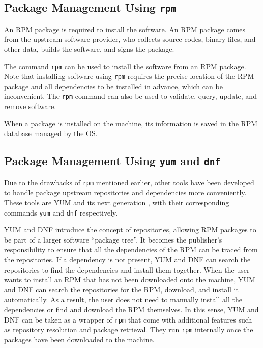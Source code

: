 \subsection{Package Management Using \texttt{rpm}}

An RPM package is required to install the software. An RPM package comes from the upstream software provider, who collects source codes, binary files, and other data, builds the software, and signs the package.

The command \verb|rpm| can be used to install the software from an RPM package. Note that installing software using \verb|rpm| requires the precise location of the RPM package and all dependencies to be installed in advance, which can be inconvenient. The \verb|rpm| command can also be used to validate, query, update, and remove software.

When a package is installed on the machine, its information is saved in the RPM database managed by the OS.

\subsection{Package Management Using \texttt{yum} and \texttt{dnf}}

Due to the drawbacks of \verb|rpm| mentioned earlier, other tools have been developed to handle package upstream repositories and dependencies more conveniently. These tools are YUM and its next generation , with their corresponding commands \verb|yum| and \verb|dnf| respectively.

YUM and DNF introduce the concept of repositories, allowing RPM packages to be part of a larger software ``package tree''. It becomes the publisher's responsibility to ensure that all the dependencies of the RPM can be traced from the repositories. If a dependency is not present, YUM and DNF can search the repositories to find the dependencies and install them together. When the user wants to install an RPM that has not been downloaded onto the machine, YUM and DNF can search the repositories for the RPM, download, and install it automatically. As a result, the user does not need to manually install all the dependencies or find and download the RPM themselves. In this sense, YUM and DNF can be taken as a wrapper of \verb|rpm| that come with additional features such as repository resolution and package retrieval. They run \verb|rpm| internally once the packages have been downloaded to the machine.

